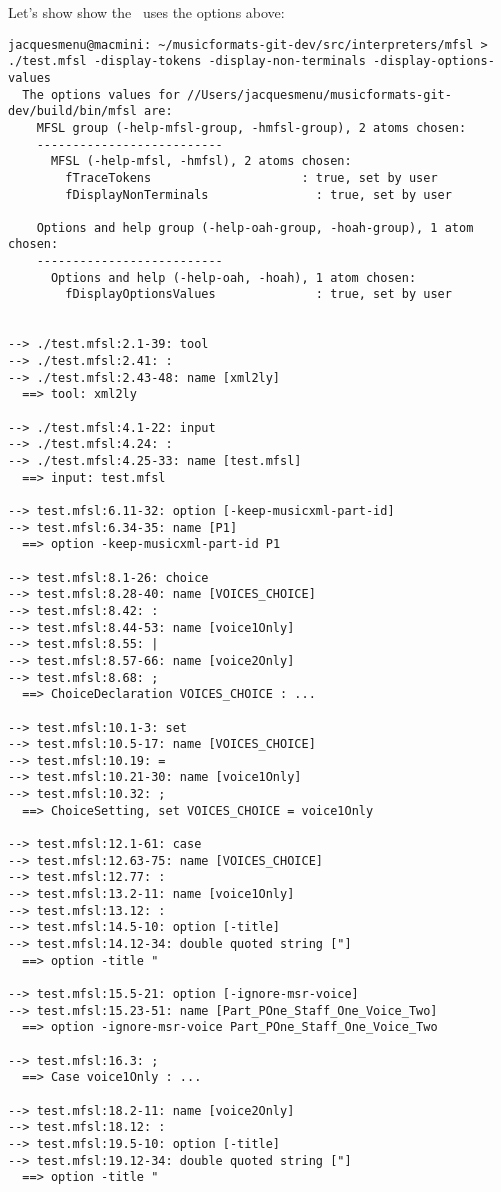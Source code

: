 Let's show show the \mfslInterp\ uses the options above:
\begin{lstlisting}[language=Terminal]
jacquesmenu@macmini: ~/musicformats-git-dev/src/interpreters/mfsl > ./test.mfsl -display-tokens -display-non-terminals -display-options-values
  The options values for //Users/jacquesmenu/musicformats-git-dev/build/bin/mfsl are:
    MFSL group (-help-mfsl-group, -hmfsl-group), 2 atoms chosen:
    --------------------------
      MFSL (-help-mfsl, -hmfsl), 2 atoms chosen:
        fTraceTokens                     : true, set by user
        fDisplayNonTerminals               : true, set by user

    Options and help group (-help-oah-group, -hoah-group), 1 atom chosen:
    --------------------------
      Options and help (-help-oah, -hoah), 1 atom chosen:
        fDisplayOptionsValues              : true, set by user


--> ./test.mfsl:2.1-39: tool
--> ./test.mfsl:2.41: :
--> ./test.mfsl:2.43-48: name [xml2ly]
  ==> tool: xml2ly

--> ./test.mfsl:4.1-22: input
--> ./test.mfsl:4.24: :
--> ./test.mfsl:4.25-33: name [test.mfsl]
  ==> input: test.mfsl

--> test.mfsl:6.11-32: option [-keep-musicxml-part-id]
--> test.mfsl:6.34-35: name [P1]
  ==> option -keep-musicxml-part-id P1

--> test.mfsl:8.1-26: choice
--> test.mfsl:8.28-40: name [VOICES_CHOICE]
--> test.mfsl:8.42: :
--> test.mfsl:8.44-53: name [voice1Only]
--> test.mfsl:8.55: |
--> test.mfsl:8.57-66: name [voice2Only]
--> test.mfsl:8.68: ;
  ==> ChoiceDeclaration VOICES_CHOICE : ...

--> test.mfsl:10.1-3: set
--> test.mfsl:10.5-17: name [VOICES_CHOICE]
--> test.mfsl:10.19: =
--> test.mfsl:10.21-30: name [voice1Only]
--> test.mfsl:10.32: ;
  ==> ChoiceSetting, set VOICES_CHOICE = voice1Only

--> test.mfsl:12.1-61: case
--> test.mfsl:12.63-75: name [VOICES_CHOICE]
--> test.mfsl:12.77: :
--> test.mfsl:13.2-11: name [voice1Only]
--> test.mfsl:13.12: :
--> test.mfsl:14.5-10: option [-title]
--> test.mfsl:14.12-34: double quoted string ["]
  ==> option -title "

--> test.mfsl:15.5-21: option [-ignore-msr-voice]
--> test.mfsl:15.23-51: name [Part_POne_Staff_One_Voice_Two]
  ==> option -ignore-msr-voice Part_POne_Staff_One_Voice_Two

--> test.mfsl:16.3: ;
  ==> Case voice1Only : ...

--> test.mfsl:18.2-11: name [voice2Only]
--> test.mfsl:18.12: :
--> test.mfsl:19.5-10: option [-title]
--> test.mfsl:19.12-34: double quoted string ["]
  ==> option -title "


\end{lstlisting}
